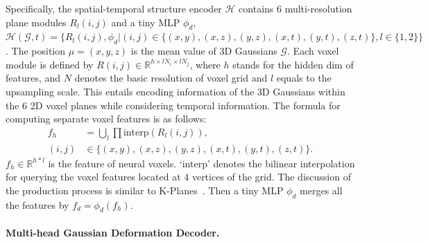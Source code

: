 \documentclass[10pt,twocolumn,letterpaper]{article}
\begin{document}
Specifically, the spatial-temporal structure encoder $\mathcal{H}$ contains 6 multi-resolution plane modules $R_l(i,j)$ and a tiny MLP $\phi_d$, \ie $\mathcal{H}(\mathcal{G},t)=\{R_l(i,j), \phi_d | (i,j) \in \{(x,y),(x,z),(y,z),(x,t),(y,t),(z,t)\}, l \in \{1,2\}\}$. The position $\mu = (x,y,z)$ is the mean value of 3D Gaussians $\mathcal{G}$. Each voxel module is defined by $R(i,j)\in \mathbb{R}^{h\times l N_i \times l N_j}$, where $h$ stands for the hidden dim of features, and $N$ denotes the basic resolution of voxel grid and $l$ equals to the upsampling scale. 
This entails encoding information of the 3D Gaussians within the 6 2D voxel planes while considering temporal information. The formula for computing separate voxel features is as follows:
\begin{equation}
\begin{aligned}
  f_h &= \bigcup_l \prod \text{interp}(R_l(i,j)), \\
    (i,j) &\in \{(x,y),(x,z),(y,z),(x,t),(y,t),(z,t)\}. 
\end{aligned}
\label{formula:feature_position}
\end{equation}
$f_{h} \in \mathbb{R}^{h*l}$ is the feature of neural voxels. `interp' denotes the bilinear interpolation for querying the voxel features located at 4 vertices of the grid. The discussion of the production process is similar to K-Planes~\cite{kplanes}. Then a tiny MLP $\phi_d$ merges all the features by $f_d = \phi_d(f_h)$.


\paragraph{Multi-head Gaussian Deformation Decoder.}
\label{subsec:Gaussian Deformation Decoder}
\end{document}
